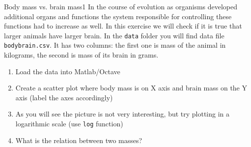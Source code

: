 \documentclass[a4paper,11pt]{article}
\begin{document}
%
%
\begin{exercise}{2}{Body mass vs. brain mass}{1}
In the course of evolution as organisms developed additional organs and functions the system responsible for controlling these functions had to increase as well. In this exercise we will check if it is true that larger animals have larger brain. In the \texttt{data} folder you will find data file \texttt{bodybrain.csv}. It has two columns: the first one is mass of the animal in kilograms, the second is mass of its brain in grams.
\begin{enumerate}
	\item Load the data into Matlab/Octave
	\item Create a scatter plot where body mass is on X axis and brain mass on the Y axis (label the axes accordingly)
	\item As you will see the picture is not very interesting, but try plotting in a logarithmic scale (use \texttt{log} function)
	\item What is the relation between two masses?
\end{enumerate}
\end{exercise}
\end{document}
